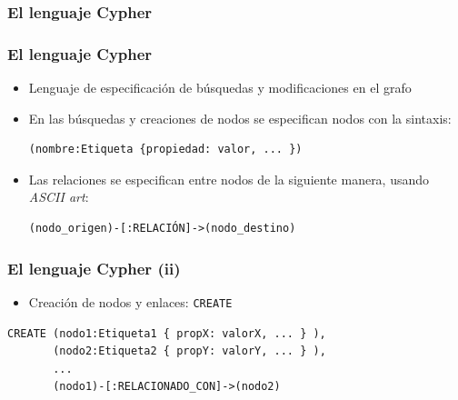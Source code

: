 \documentclass[14pt]{beamer}
\begin{document}
\begin{frame}
\begin{itemize}



\subsubsection{El lenguaje Cypher}

\begin{frame}[fragile]
  \frametitle{El lenguaje Cypher}
  \begin{itemize}
\item Lenguaje de especificación de búsquedas y modificaciones en el
  grafo
\item En las búsquedas y creaciones de nodos se especifican nodos con la
  sintaxis:
\begin{lstlisting}[language=cypher]
(nombre:Etiqueta {propiedad: valor, ... })
\end{lstlisting}

\item Las relaciones se especifican entre nodos de la siguiente manera,
  usando {\em ASCII art}:

\begin{lstlisting}[language=cypher]
(nodo_origen)-[:RELACIÓN]->(nodo_destino)
\end{lstlisting}
  \end{itemize}
\end{frame}

\begin{frame}[fragile]
  \frametitle{El lenguaje Cypher (ii)}
  \begin{itemize}
  \item Creación de nodos y enlaces: {\tt CREATE}
  \end{itemize}

\begin{lstlisting}[language=cypher]
CREATE (nodo1:Etiqueta1 { propX: valorX, ... } ),
       (nodo2:Etiqueta2 { propY: valorY, ... } ),
       ...
       (nodo1)-[:RELACIONADO_CON]->(nodo2)
\end{lstlisting}
\end{frame}


\end{itemize}
\end{frame}
\end{document}
